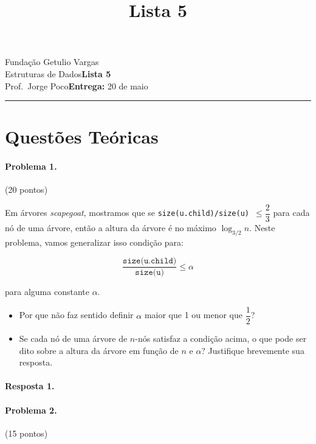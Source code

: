 \documentclass{article}
\title{Lista 5}
\date{}
\newcommand{\assignment}{Lista 5}
\newcommand{\duedate}{20 de maio}
\begin{document}
Fundação Getulio Vargas\hfill\\
Estruturas de Dados\hfill\textbf{\assignment}\\
Prof.\ Jorge Poco\hfill\textbf{Entrega:} \duedate\\
\smallskip\hrule\bigskip

{\let\newpage\relax\maketitle}
\maketitle

\section{Questões Teóricas}

\paragraph{Problema 1.} (20 pontos)

Em árvores \textit{scapegoat}, mostramos que se \texttt{size(u.child)/size(u) $\leq \dfrac{2}{3}$} para cada nó de uma árvore, então a altura da árvore é no máximo $\log_{3/2} n$. Neste problema, vamos generalizar isso
condição para:

\begin{equation*}
    \dfrac{\texttt{size(u.child)}}{\texttt{size(u)}} \leq \alpha
\end{equation*}

para alguma constante $\alpha$.

\begin{itemize}
\item Por que não faz sentido definir $\alpha$ maior que 1 ou menor que $\dfrac{1}{2}$?
\item Se cada nó de uma árvore de $n$-nós satisfaz a condição acima, o que pode ser dito sobre a altura da árvore em função de $n$ e $\alpha$? Justifique brevemente sua resposta.
\end{itemize}

\paragraph{Resposta 1.}

\paragraph{Problema 2.} (15 pontos)
\end{document}
